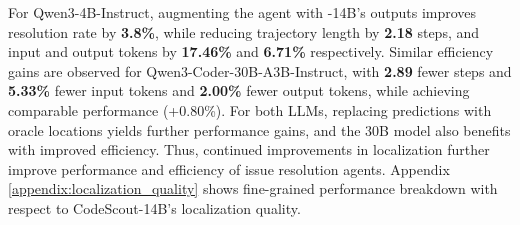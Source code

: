 \begin{table}
    \centering
    \caption{Issue resolution performance on SWE-Bench Verified: augmenting the agent with relevant locations improves performance and efficiency. Best metric is \textbf{bold-faced} and 2$^{nd}$ best is \underline{underlined}.}
    \label{tab:downstream_swe_bench}
\end{table}
For Qwen3-4B-Instruct, augmenting the agent with \methodname-14B's outputs improves resolution rate by \textbf{3.8\%}, while reducing trajectory length by \textbf{2.18} steps, and input and output tokens by \textbf{17.46\%} and \textbf{6.71\%} respectively.  Similar efficiency gains are observed for Qwen3-Coder-30B-A3B-Instruct, with \textbf{2.89} fewer steps and \textbf{5.33\%} fewer input tokens and \textbf{2.00\%} fewer output tokens, while achieving comparable performance (+0.80\%). For both LLMs, replacing \methodname predictions with oracle locations yields further performance gains, and the 30B model also benefits with improved efficiency. Thus, continued improvements in localization further improve performance and efficiency of issue resolution agents. Appendix \ref{appendix:localization_quality} shows fine-grained performance breakdown with respect to CodeScout-14B's localization quality.

